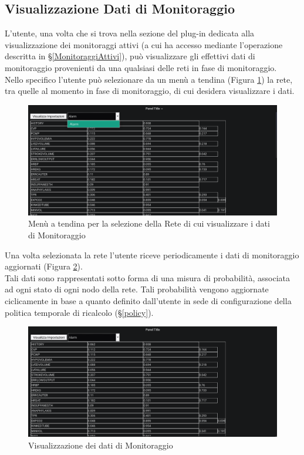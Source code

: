 \subsection{Visualizzazione Dati di Monitoraggio}\label{VisualDati}

L'utente, una volta che si trova nella sezione del plug-in dedicata alla visualizzazione dei monitoraggi attivi (a cui ha accesso mediante l'operazione descritta in §\ref{MonitoraggiAttivi}), può visualizzare gli effettivi dati di monitoraggio provenienti da una qualsiasi delle reti in fase di monitoraggio.\\
Nello specifico l'utente può selezionare da un menù a tendina (Figura \ref{SelezioneMonitoraggio}) la rete, tra quelle al momento in fase di monitoraggio, di cui desidera visualizzare i dati.

\begin{figure}[H]
	\begin{center}
		\includegraphics[scale=0.4]{./images/SelezioneMonitoraggio.png}
		 \caption{Menù a tendina per la selezione della Rete di cui visualizzare i dati di Monitoraggio}	
		 \label{SelezioneMonitoraggio}
	\end{center}
\end{figure}

Una volta selezionata la rete l'utente riceve periodicamente i dati di monitoraggio aggiornati (Figura \ref{DatiMonitoraggio}).\\
Tali dati sono rappresentati sotto forma di una misura di probabilità, associata ad ogni stato di ogni nodo della rete. Tali probabilità vengono aggiornate ciclicamente in base a quanto definito dall'utente in sede di configurazione della politica temporale di ricalcolo (§\ref{policy}).

\begin{figure}[H]
	\begin{center}
		\includegraphics[scale=0.4]{./images/DatiMonitoraggio.png}
		 \caption{Visualizzazione dei dati di Monitoraggio}	
		 \label{DatiMonitoraggio}
	\end{center}
\end{figure}
